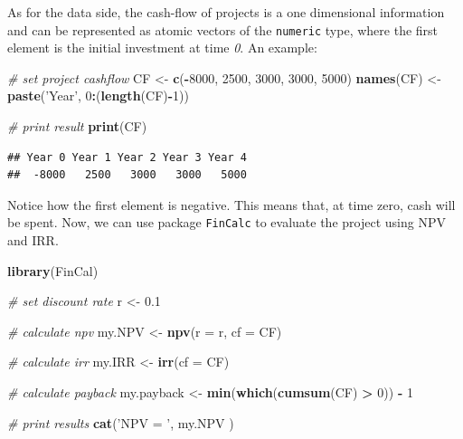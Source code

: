 \documentclass[11pt,]{book}
\newenvironment{Shaded}{\begin{snugshade}}{\end{snugshade}}
\newcommand{\KeywordTok}[1]{\textcolor[rgb]{0.27,0.27,0.27}{\textbf{#1}}}
\newcommand{\DataTypeTok}[1]{\textcolor[rgb]{0.27,0.27,0.27}{#1}}
\newcommand{\DecValTok}[1]{\textcolor[rgb]{0.06,0.06,0.06}{#1}}
\newcommand{\FloatTok}[1]{\textcolor[rgb]{0.06,0.06,0.06}{#1}}
\newcommand{\StringTok}[1]{\textcolor[rgb]{0.5,0.5,0.5}{#1}}
\newcommand{\CommentTok}[1]{\textcolor[rgb]{0.56,0.35,0.01}{\textit{#1}}}
\newcommand{\OperatorTok}[1]{\textcolor[rgb]{0.81,0.36,0.00}{\textbf{#1}}}
\newcommand{\NormalTok}[1]{#1}
\begin{document}
As for the data side, the cash-flow of projects is a one dimensional
information and can be represented as atomic vectors of the
\texttt{numeric} type, where the first element is the initial investment
at time \emph{0}. An example:

\begin{Shaded}
\begin{Highlighting}[]
\CommentTok{# set project cashflow}
\NormalTok{CF <-}\StringTok{ }\KeywordTok{c}\NormalTok{(}\OperatorTok{-}\DecValTok{8000}\NormalTok{, }\DecValTok{2500}\NormalTok{, }\DecValTok{3000}\NormalTok{, }\DecValTok{3000}\NormalTok{, }\DecValTok{5000}\NormalTok{)}
\KeywordTok{names}\NormalTok{(CF) <-}\StringTok{ }\KeywordTok{paste}\NormalTok{(}\StringTok{'Year'}\NormalTok{, }\DecValTok{0}\OperatorTok{:}\NormalTok{(}\KeywordTok{length}\NormalTok{(CF)}\OperatorTok{-}\DecValTok{1}\NormalTok{))}

\CommentTok{# print result}
\KeywordTok{print}\NormalTok{(CF)}
\end{Highlighting}
\end{Shaded}

\begin{verbatim}
## Year 0 Year 1 Year 2 Year 3 Year 4 
##  -8000   2500   3000   3000   5000
\end{verbatim}

Notice how the first element is negative. This means that, at time zero,
cash will be spent. Now, we can use package \texttt{FinCalc}
\citep{fincal} to evaluate the project using NPV and IRR.

\begin{Shaded}
\begin{Highlighting}[]
\KeywordTok{library}\NormalTok{(FinCal)}

\CommentTok{# set discount rate}
\NormalTok{r <-}\StringTok{ }\FloatTok{0.1}

\CommentTok{# calculate npv}
\NormalTok{my.NPV <-}\StringTok{ }\KeywordTok{npv}\NormalTok{(}\DataTypeTok{r =}\NormalTok{ r, }\DataTypeTok{cf =}\NormalTok{ CF)}

\CommentTok{# calculate irr}
\NormalTok{my.IRR <-}\StringTok{ }\KeywordTok{irr}\NormalTok{(}\DataTypeTok{cf =}\NormalTok{ CF)}

\CommentTok{# calculate payback}
\NormalTok{my.payback <-}\StringTok{ }\KeywordTok{min}\NormalTok{(}\KeywordTok{which}\NormalTok{(}\KeywordTok{cumsum}\NormalTok{(CF) }\OperatorTok{>}\StringTok{ }\DecValTok{0}\NormalTok{)) }\OperatorTok{-}\StringTok{ }\DecValTok{1}

\CommentTok{# print results}
\KeywordTok{cat}\NormalTok{(}\StringTok{'NPV = '}\NormalTok{, my.NPV )}
\end{Highlighting}
\end{Shaded}
\end{document}
